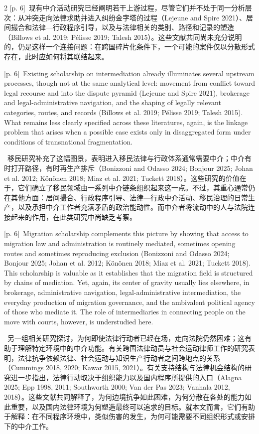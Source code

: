 \documentclass[10pt,a4paper]{article}
\begin{document}
\begin{paracol}{2}
{\scriptsize\color{gray} [p. 6]}\ 现有中介活动研究已经阐明若干上游过程，尽管它们并不处于同一分析层次：从冲突走向法律求助并进入纠纷金字塔的过程（Lejeune and Spire 2021）、居间撮合和法律—行政程序引导，以及与法律相关的类别、路径和记录的塑造（Billows et al. 2019; Pélisse 2019; Talesh 2015）。这些文献共同尚未充分说明的，仍是这样一个连接问题：在跨国碎片化条件下，一个可能的案件仅以分散形式存在，此时应如何将其联结起来。\par
\switchcolumn
{\scriptsize\color{gray} [p. 6]}\ Existing scholarship on intermediation already illuminates several upstream processes, though not at the same analytical level: movement from conflict toward legal recourse and into the dispute pyramid (Lejeune and Spire 2021), brokerage and legal-administrative navigation, and the shaping of legally relevant categories, routes, and records (Billows et al. 2019; Pélisse 2019; Talesh 2015). What remains less clearly specified across these literatures, again, is the linkage problem that arises when a possible case exists only in disaggregated form under conditions of transnational fragmentation.\par
\switchcolumn*
{\scriptsize\color{gray} [p. 6]}\ 移民研究补充了这幅图景，表明进入移民法律与行政体系通常需要中介；中介有时打开路径，有时再生产排斥（Bonizzoni and Odasso 2024; Bonjour 2025; Johan et al. 2012; Könönen 2018; Miaz et al. 2021; Tuckett 2018）。这些研究的价值在于，它们确立了移民领域由一系列中介链条组织起来这一点。不过，其重心通常仍在其他方面：居间撮合、行政程序引导、法律—行政中介活动、移民治理的日常生产，以及承担中介工作者充满矛盾的政治能动性。而中介者将流动中的人与法院连接起来的作用，在此类研究中尚缺乏考察。\par
\switchcolumn
{\scriptsize\color{gray} [p. 6]}\ Migration scholarship complements this picture by showing that access to migration law and administration is routinely mediated, sometimes opening routes and sometimes reproducing exclusion (Bonizzoni and Odasso 2024; Bonjour 2025; Johan et al. 2012; Könönen 2018; Miaz et al. 2021; Tuckett 2018). This scholarship is valuable as it establishes that the migration field is structured by chains of mediation. Yet, again, its center of gravity usually lies elsewhere, in brokerage, administrative navigation, legal-administrative intermediation, the everyday production of migration governance, and the ambivalent political agency of those who mediate it. The role of intermediaries in connecting people on the move with courts, however, is understudied here.\par
\switchcolumn*
{\scriptsize\color{gray} [p. 6]}\ 另一组相关研究探讨，为何即使法律行动者已经在场，走向法院仍然困难；这有助于理解特定环境中的中介功能。有关跨国法律动员与社会运动律师工作的研究表明，法律抗争依赖法律、社会运动与知识生产行动者之间跨地点的关系（Cummings 2018, 2020; Kawar 2015, 2021）。有关支持结构与法律机会结构的研究进一步指出，法律行动取决于组织能力以及国内程序所提供的入口（Alagna 2025; Epp 1998, 2011; Southworth 2000; Van der Pas 2023; Vanhala 2012, 2018）。这些文献共同解释了，为何边境抗争如此困难，为何分散在各处的能力如此重要，以及国内法律环境为何塑造最终可以追求的目标。就本文而言，它们有助于解释：在不同程序环境中，类似伤害的发生，为何可能需要不同组织形式或安排下的中介工作。\par

\end{paracol}
\end{document}
